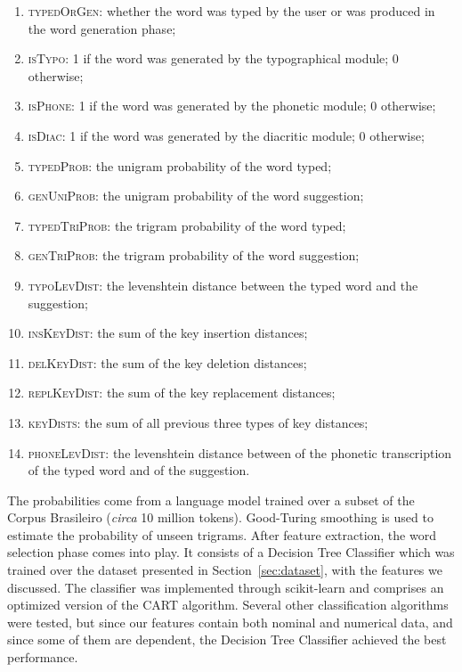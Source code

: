 \begin{enumerate}
\setlength{\itemsep}{1pt}
\item \textsc{typedOrGen}: whether the word was typed by the user or was produced in the word generation phase;
\item \textsc{isTypo}: 1 if the word was generated by the typographical module; 0 otherwise;
\item \textsc{isPhone}: 1 if the word was generated by the phonetic module; 0 otherwise;
\item \textsc{isDiac}: 1 if the word was generated by the diacritic module; 0 otherwise;
\item \textsc{typedProb}: the unigram probability of the word typed;
\item \textsc{genUniProb}: the unigram probability of the word suggestion;
\item \textsc{typedTriProb}: the trigram probability of the word typed;
\item \textsc{genTriProb}: the trigram probability of the word suggestion;
\item \textsc{typoLevDist}: the levenshtein distance between the typed word and the suggestion;
\item \textsc{insKeyDist}: the sum of the key insertion distances;
\item \textsc{delKeyDist}: the sum of the key deletion distances;
\item \textsc{replKeyDist}: the sum of the key replacement distances;
\item \textsc{keyDists}: the sum of all previous three types of key distances;
\item \textsc{phoneLevDist}: the levenshtein distance between of the phonetic transcription of the typed word and of the suggestion. 
\end{enumerate}

The probabilities come from a language model trained over a subset of the Corpus Brasileiro (\emph{circa} 10 million tokens). Good-Turing smoothing is used to estimate the probability of unseen trigrams.
After feature extraction, the word selection phase comes into play. It consists of a Decision Tree Classifier which was trained over the dataset presented in Section~\ref{sec:dataset}, with the features we discussed. 
The classifier was implemented through scikit-learn \cite{Pedregosa2011} and comprises an optimized version of the CART algorithm. Several other classification algorithms were tested, but since our features contain both nominal and numerical data, and since some of them are dependent, the Decision Tree Classifier achieved the best performance.

